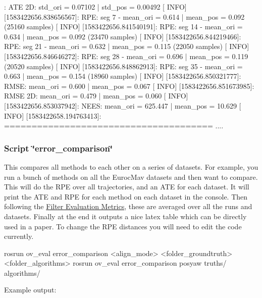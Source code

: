 \begin{DoxyCode}
[ INFO] [1583422656.835457020]:     ATE 2D: std\_ori  = 0.07102 | std\_pos  = 0.00492
[ INFO] [1583422656.838656567]:     RPE: seg 7 - mean\_ori = 0.614 | mean\_pos = 0.092 (25160 samples)
[ INFO] [1583422656.841540191]:     RPE: seg 14 - mean\_ori = 0.634 | mean\_pos = 0.092 (23470 samples)
[ INFO] [1583422656.844219466]:     RPE: seg 21 - mean\_ori = 0.632 | mean\_pos = 0.115 (22050 samples)
[ INFO] [1583422656.846646272]:     RPE: seg 28 - mean\_ori = 0.696 | mean\_pos = 0.119 (20520 samples)
[ INFO] [1583422656.848862913]:     RPE: seg 35 - mean\_ori = 0.663 | mean\_pos = 0.154 (18960 samples)
[ INFO] [1583422656.850321777]:     RMSE: mean\_ori = 0.600 | mean\_pos = 0.067
[ INFO] [1583422656.851673985]:     RMSE 2D: mean\_ori = 0.479 | mean\_pos = 0.060
[ INFO] [1583422656.853037942]:     NEES: mean\_ori = 625.447 | mean\_pos = 10.629
[ INFO] [1583422658.194763413]: ======================================
....
\end{DoxyCode}


\hypertarget{eval-error_eval-ov-plot-comparison}{}\subsubsection{Script \char`\"{}error\+\_\+comparison\char`\"{}}\label{eval-error_eval-ov-plot-comparison}
This compares all methods to each other on a series of datasets. For example, you run a bunch of methods on all the Euroc\+Mav datasets and then want to compare. This will do the R\+PE over all trajectories, and an A\+TE for each dataset. It will print the A\+TE and R\+PE for each method on each dataset in the console. Then following the \hyperlink{eval-metrics}{Filter Evaluation Metrics}, these are averaged over all the runs and datasets. Finally at the end it outputs a nice latex table which can be directly used in a paper. To change the R\+PE distances you will need to edit the code currently.


\begin{DoxyCode}
rosrun ov\_eval error\_comparison <align\_mode> <folder\_groundtruth> <folder\_algorithms>
rosrun ov\_eval error\_comparison posyaw truths/ algorithms/
\end{DoxyCode}


Example output\+:


